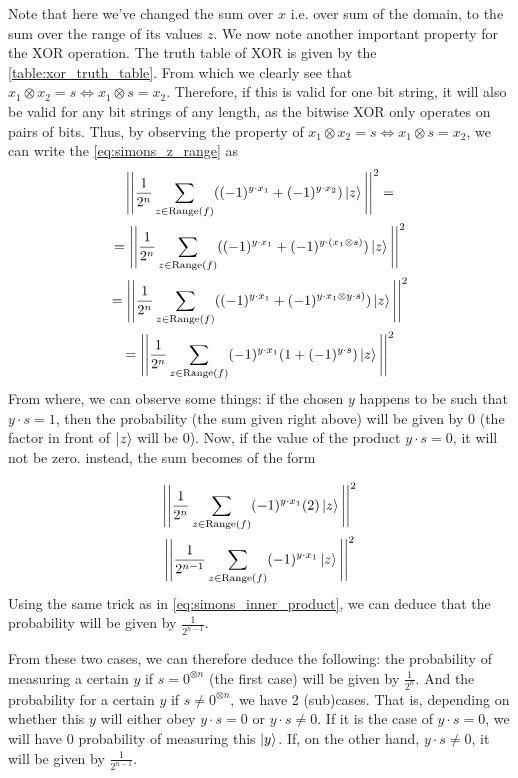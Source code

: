 Note that here we've changed the sum over $x$ i.e. over sum of the domain, to the sum over the range of its values $z$.
We now note another important property for the XOR operation. The truth table of XOR is given by the \autoref{table:xor_truth_table}.
From which we clearly see that $x_1 \otimes x_2 = s \iff x_1 \otimes s = x_2$. Therefore, if this is valid for one bit string, it 
will also be valid for any bit strings of any length, as the bitwise XOR only operates on pairs of bits.
Thus, by observing the property of $x_1 \otimes x_2 = s \iff x_1 \otimes s = x_2$, we can write the \autoref{eq:simons_z_range} 
as
\begin{gather}
  \Bigg|\Bigg| \frac{1}{2^n} \sum_{z\in \text{Range}(f)}((-1)^{y\cdot x_1} +(-1)^{y\cdot x_2})\ket{z} \Bigg| \Bigg|^2 =\\
  =\Bigg| \Bigg| \frac{1}{2^n} \sum_{z\in \text{Range}(f)}((-1)^{y\cdot x_1} +(-1)^{y\cdot (x_1 \otimes s)})\ket{z} \Bigg| \Bigg|^2 \\
  =\Bigg| \Bigg| \frac{1}{2^n} \sum_{z\in \text{Range}(f)}((-1)^{y\cdot x_1} +(-1)^{y\cdot x_1 \otimes y\cdot s)})\ket{z} \Bigg| \Bigg|^2 \\
  =\Bigg| \Bigg| \frac{1}{2^n} \sum_{z\in \text{Range}(f)} (-1)^{y\cdot x_1}(1+(-1)^{y\cdot s})\ket{z} \Bigg| \Bigg|^2 
\end{gather}
From where, we can observe some things: if the chosen $y$ happens to be such that $y\cdot s = 1$, then the probability (the sum given right above)
will be given by 0 (the factor in front of $\ket{z}$ will be 0). Now, if the value of the product $y\cdot s = 0$, it will not be zero.
instead, the sum becomes of the form 

\begin{gather}
  \Bigg| \Bigg| \frac{1}{2^n} \sum_{z\in \text{Range}(f)} (-1)^{y\cdot x_1}(2)\ket{z} \Bigg| \Bigg|^2 \\
  \Bigg| \Bigg| \frac{1}{2^{n-1}} \sum_{z\in \text{Range}(f)} (-1)^{y\cdot x_1}\ket{z} \Bigg| \Bigg|^2 
\end{gather}
Using the same trick as in \autoref{eq:simons_inner_product}, we can deduce that the probability will be given by $\frac{1}{2^{n-1}}$.

From these two cases, we can therefore deduce the following: the probability of measuring a certain $y$ if $s=0^{\otimes n}$ (the first case) will be given 
by $\frac{1}{2^n}$.
And the probability for a certain $y$ if $s\neq 0^{\otimes n}$, we have 2 (sub)cases. That is, depending on whether this $y$ will either obey
$y\cdot s=0$ or $y\cdot s\neq 0$. If it is the case of $y\cdot s=0$, we will have 0 probability of measuring this $\ket{y}$. If, on the other hand,
$y\cdot s\neq 0$, it will be given by $\frac{1}{2^{n-1}}$. 


